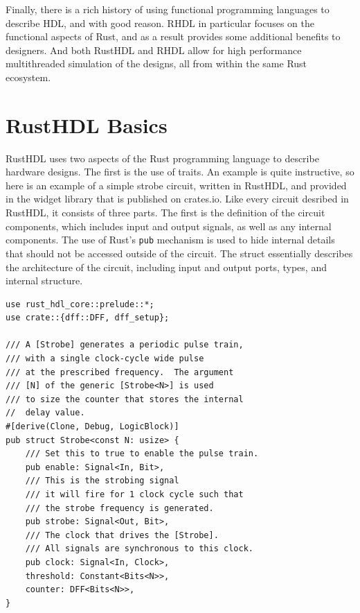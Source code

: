 \documentclass[conference]{IEEEtran}
\begin{document}
Finally, there is a rich history of using functional programming languages to describe HDL, and
with good reason.  RHDL in particular focuses on the functional aspects of Rust, and as a result 
provides some additional benefits to designers.  And both RustHDL and RHDL allow for high performance 
multithreaded simulation of the designs, all from within the same Rust ecosystem.

\section{RustHDL Basics}

RustHDL uses two aspects of the Rust programming language to describe hardware designs.  The first
is the use of traits.  An example is quite instructive, so here is an example of a simple strobe
circuit, written in RustHDL, and provided in the widget library that is published on crates.io.  Like 
every circuit desribed in RustHDL, it consists of three parts.  The first is the definition of the
circuit components, which includes input and output signals, as well as any internal components.
The use of Rust's \verb|pub| mechanism is used to hide internal details that should not be accessed
outside of the circuit.  The struct essentially describes the architecture of the circuit, including
input and output ports, types, and internal structure.

\begin{verbatim}
use rust_hdl_core::prelude::*;
use crate::{dff::DFF, dff_setup};

/// A [Strobe] generates a periodic pulse train, 
/// with a single clock-cycle wide pulse
/// at the prescribed frequency.  The argument 
/// [N] of the generic [Strobe<N>] is used
/// to size the counter that stores the internal 
//  delay value.  
#[derive(Clone, Debug, LogicBlock)]
pub struct Strobe<const N: usize> {
    /// Set this to true to enable the pulse train.
    pub enable: Signal<In, Bit>,
    /// This is the strobing signal 
    /// it will fire for 1 clock cycle such that 
    /// the strobe frequency is generated.
    pub strobe: Signal<Out, Bit>,
    /// The clock that drives the [Strobe].  
    /// All signals are synchronous to this clock.
    pub clock: Signal<In, Clock>,
    threshold: Constant<Bits<N>>,
    counter: DFF<Bits<N>>,
}
\end{verbatim}
\end{document}
